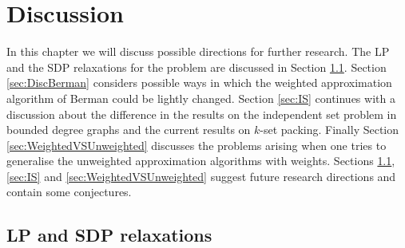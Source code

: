 \chapter{Discussion}\label{chap:Discussion}

In this chapter we will discuss possible directions for further research. The LP and the SDP relaxations for the problem are discussed in Section \ref{sec:DiscLP}. Section \ref{sec:DiscBerman} considers possible ways in which the weighted approximation algorithm of Berman \cite{Berman} could be lightly changed. Section \ref{sec:IS} continues with a discussion about the difference in the results on the independent set problem in bounded degree graphs and the current results on $k$-set packing. Finally Section \ref{sec:WeightedVSUnweighted} discusses the problems arising when one tries to generalise the unweighted approximation algorithms with weights. Sections \ref{sec:DiscLP}, \ref{sec:IS} and \ref{sec:WeightedVSUnweighted} suggest future research directions and contain some conjectures. %


\section{LP and SDP relaxations}\label{sec:DiscLP}

